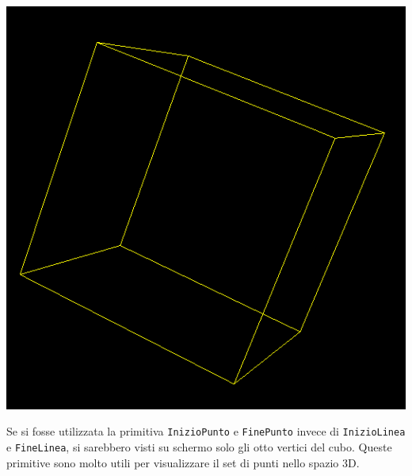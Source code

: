 \begin{center}
	\includegraphics*[scale=0.4]{pics/3dCube2.png}
\end{center}
Se si fosse utilizzata la primitiva \texttt{InizioPunto} e \texttt{FinePunto} invece di \texttt{InizioLinea} e \texttt{FineLinea}, si sarebbero visti su schermo solo gli otto vertici del cubo. Queste primitive sono molto utili per visualizzare il set di punti nello spazio 3D.


